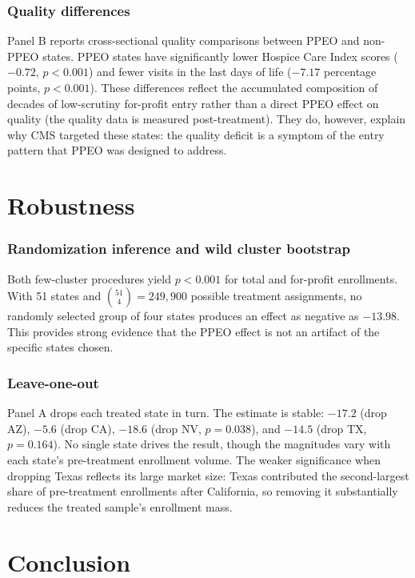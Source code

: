 \documentclass[12pt]{article}
\begin{document}
\subsubsection*{Quality differences}  Panel B reports cross-sectional quality comparisons between PPEO and non-PPEO states. PPEO states have significantly lower Hospice Care Index scores ($-0.72$, $p < 0.001$) and fewer visits in the last days of life ($-7.17$ percentage points, $p < 0.001$). These differences reflect the accumulated composition of decades of low-scrutiny for-profit entry rather than a direct PPEO effect on quality (the quality data is measured post-treatment). They do, however, explain why CMS targeted these states: the quality deficit is a symptom of the entry pattern that PPEO was designed to address.


\section{Robustness}
\label{sec:robustness}

\subsubsection*{Randomization inference and wild cluster bootstrap} Both few-cluster procedures yield $p < 0.001$ for total and for-profit enrollments. With 51 states and ${51 \choose 4} = 249,900$ possible treatment assignments, no randomly selected group of four states produces an effect as negative as $-13.98$. This provides strong evidence that the PPEO effect is not an artifact of the specific states chosen.

\subsubsection*{Leave-one-out}  Panel A drops each treated state in turn. The estimate is stable: $-17.2$ (drop AZ), $-5.6$ (drop CA), $-18.6$ (drop NV, $p = 0.038$), and $-14.5$ (drop TX, $p = 0.164$). No single state drives the result, though the magnitudes vary with each state's pre-treatment enrollment volume. The weaker significance when dropping Texas reflects its large market size: Texas contributed the second-largest share of pre-treatment enrollments after California, so removing it substantially reduces the treated sample's enrollment mass.




\section{Conclusion}
\label{sec:conclusion}
\end{document}
